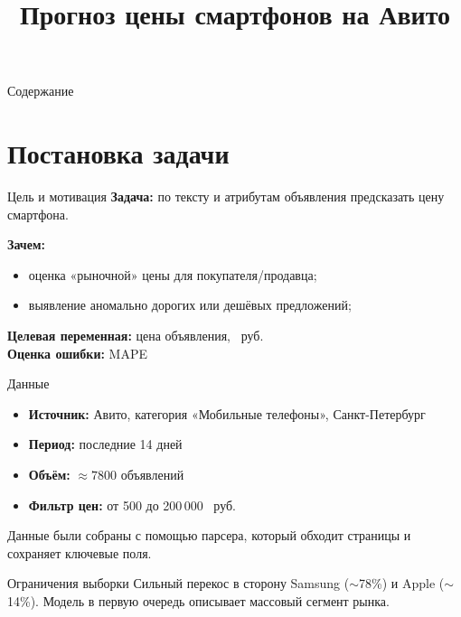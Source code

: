 \documentclass[aspectratio=169,12pt]{beamer}
\title{Прогноз цены смартфонов на Авито}
\date{}
\newcommand{\rub}{~руб.}
\begin{document}
\begin{frame}
  \titlepage
\end{frame}

\begin{frame}{Содержание}
  \tableofcontents
\end{frame}

\section{Постановка задачи}

\begin{frame}{Цель и мотивация}
  \textbf{Задача:} по тексту и атрибутам объявления предсказать цену смартфона.

  \vspace{0.6em}
  \textbf{Зачем:}
  \begin{itemize}
    \item оценка «рыночной» цены для покупателя/продавца;
    \item выявление аномально дорогих или дешёвых предложений;
  \end{itemize}

  \vspace{0.6em}
  \textbf{Целевая переменная:} цена объявления, \rub \\

    \vspace{0.6em}
  \textbf{Оценка ошибки:} MAPE \\
\end{frame}

\begin{frame}{Данные}
  \begin{itemize}
    \item \textbf{Источник:} Авито, категория «Мобильные телефоны», Санкт-Петербург
    \item \textbf{Период:} последние 14 дней
    \item \textbf{Объём:} $\approx 7800$ объявлений
    \item \textbf{Фильтр цен:} от 500 до 200\,000 \rub
  \end{itemize}

  Данные были собраны с помощью парсера, который обходит страницы и сохраняет ключевые поля.

  \vspace{0.5em}
  \begin{block}{Ограничения выборки}
    Сильный перекос в сторону Samsung ($\sim$78\%) и Apple ($\sim$14\%).
    Модель в первую очередь описывает массовый сегмент рынка.
  \end{block}
\end{frame}
\end{document}
